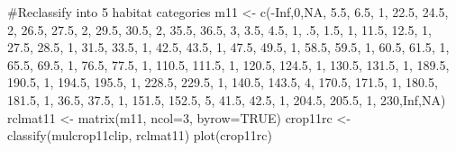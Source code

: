 \documentclass[
  letterpaper,
]{book}
\newenvironment{Shaded}{\begin{snugshade}}{\end{snugshade}}
\newcommand{\AttributeTok}[1]{\textcolor[rgb]{0.40,0.45,0.13}{#1}}
\newcommand{\CommentTok}[1]{\textcolor[rgb]{0.37,0.37,0.37}{#1}}
\newcommand{\ConstantTok}[1]{\textcolor[rgb]{0.56,0.35,0.01}{#1}}
\newcommand{\DecValTok}[1]{\textcolor[rgb]{0.68,0.00,0.00}{#1}}
\newcommand{\FloatTok}[1]{\textcolor[rgb]{0.68,0.00,0.00}{#1}}
\newcommand{\FunctionTok}[1]{\textcolor[rgb]{0.28,0.35,0.67}{#1}}
\newcommand{\NormalTok}[1]{\textcolor[rgb]{0.00,0.23,0.31}{#1}}
\newcommand{\OtherTok}[1]{\textcolor[rgb]{0.00,0.23,0.31}{#1}}
\newcommand{\SpecialCharTok}[1]{\textcolor[rgb]{0.37,0.37,0.37}{#1}}
\begin{document}
\begin{Shaded}
\begin{Highlighting}[]
\CommentTok{\#Reclassify into 5 habitat categories}
\NormalTok{m11 }\OtherTok{\textless{}{-}} \FunctionTok{c}\NormalTok{(}\SpecialCharTok{{-}}\ConstantTok{Inf}\NormalTok{,}\DecValTok{0}\NormalTok{,}\ConstantTok{NA}\NormalTok{, }\FloatTok{5.5}\NormalTok{, }\FloatTok{6.5}\NormalTok{, }\DecValTok{1}\NormalTok{, }\FloatTok{22.5}\NormalTok{, }\FloatTok{24.5}\NormalTok{, }\DecValTok{2}\NormalTok{, }\FloatTok{26.5}\NormalTok{, }\FloatTok{27.5}\NormalTok{, }\DecValTok{2}\NormalTok{, }\FloatTok{29.5}\NormalTok{, }\FloatTok{30.5}\NormalTok{, }\DecValTok{2}\NormalTok{, }\FloatTok{35.5}\NormalTok{, }\FloatTok{36.5}\NormalTok{, }
  \DecValTok{3}\NormalTok{, }\FloatTok{3.5}\NormalTok{, }\FloatTok{4.5}\NormalTok{, }\DecValTok{1}\NormalTok{, .}\DecValTok{5}\NormalTok{, }\FloatTok{1.5}\NormalTok{, }\DecValTok{1}\NormalTok{, }\FloatTok{11.5}\NormalTok{, }\FloatTok{12.5}\NormalTok{, }\DecValTok{1}\NormalTok{, }\FloatTok{27.5}\NormalTok{, }\FloatTok{28.5}\NormalTok{, }\DecValTok{1}\NormalTok{, }\FloatTok{31.5}\NormalTok{, }\FloatTok{33.5}\NormalTok{, }\DecValTok{1}\NormalTok{,  }\FloatTok{42.5}\NormalTok{, }\FloatTok{43.5}\NormalTok{, }\DecValTok{1}\NormalTok{, }
  \FloatTok{47.5}\NormalTok{, }\FloatTok{49.5}\NormalTok{, }\DecValTok{1}\NormalTok{, }\FloatTok{58.5}\NormalTok{, }\FloatTok{59.5}\NormalTok{, }\DecValTok{1}\NormalTok{, }\FloatTok{60.5}\NormalTok{, }\FloatTok{61.5}\NormalTok{, }\DecValTok{1}\NormalTok{, }\FloatTok{65.5}\NormalTok{, }\FloatTok{69.5}\NormalTok{, }\DecValTok{1}\NormalTok{, }\FloatTok{76.5}\NormalTok{, }\FloatTok{77.5}\NormalTok{, }\DecValTok{1}\NormalTok{, }\FloatTok{110.5}\NormalTok{, }
  \FloatTok{111.5}\NormalTok{, }\DecValTok{1}\NormalTok{, }\FloatTok{120.5}\NormalTok{, }\FloatTok{124.5}\NormalTok{, }\DecValTok{1}\NormalTok{, }\FloatTok{130.5}\NormalTok{, }\FloatTok{131.5}\NormalTok{, }\DecValTok{1}\NormalTok{, }\FloatTok{189.5}\NormalTok{, }\FloatTok{190.5}\NormalTok{, }\DecValTok{1}\NormalTok{, }\FloatTok{194.5}\NormalTok{, }\FloatTok{195.5}\NormalTok{, }\DecValTok{1}\NormalTok{, }\FloatTok{228.5}\NormalTok{,}
  \FloatTok{229.5}\NormalTok{, }\DecValTok{1}\NormalTok{, }\FloatTok{140.5}\NormalTok{, }\FloatTok{143.5}\NormalTok{, }\DecValTok{4}\NormalTok{, }\FloatTok{170.5}\NormalTok{, }\FloatTok{171.5}\NormalTok{, }\DecValTok{1}\NormalTok{, }\FloatTok{180.5}\NormalTok{, }\FloatTok{181.5}\NormalTok{, }\DecValTok{1}\NormalTok{, }\FloatTok{36.5}\NormalTok{, }\FloatTok{37.5}\NormalTok{, }\DecValTok{1}\NormalTok{, }\FloatTok{151.5}\NormalTok{, }
  \FloatTok{152.5}\NormalTok{, }\DecValTok{5}\NormalTok{, }\FloatTok{41.5}\NormalTok{, }\FloatTok{42.5}\NormalTok{, }\DecValTok{1}\NormalTok{, }\FloatTok{204.5}\NormalTok{, }\FloatTok{205.5}\NormalTok{, }\DecValTok{1}\NormalTok{, }\DecValTok{230}\NormalTok{,}\ConstantTok{Inf}\NormalTok{,}\ConstantTok{NA}\NormalTok{)}
\NormalTok{rclmat11 }\OtherTok{\textless{}{-}} \FunctionTok{matrix}\NormalTok{(m11, }\AttributeTok{ncol=}\DecValTok{3}\NormalTok{, }\AttributeTok{byrow=}\ConstantTok{TRUE}\NormalTok{)}
\NormalTok{crop11rc }\OtherTok{\textless{}{-}} \FunctionTok{classify}\NormalTok{(mulcrop11clip, rclmat11)}
\FunctionTok{plot}\NormalTok{(crop11rc)}
\end{Highlighting}
\end{Shaded}
\end{document}
